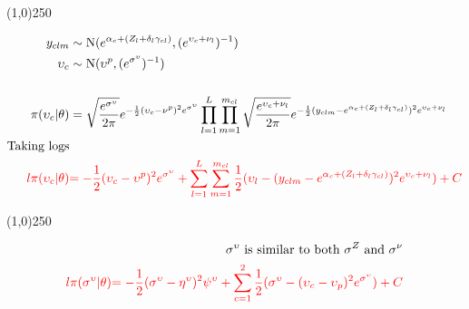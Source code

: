 \begin{center}
\line(1,0){250}
\end{center}

\begin{align*}
y_{clm} &\sim \operatorname{N}(e^{\alpha_{c}+(Z_{l}+\delta_{l}\gamma_{cl})},(e^{ \upsilon_{c}+\nu_{l} })^{-1})\\
\upsilon_{c} &\sim \operatorname{N}(\upsilon^p,({e^{\sigma^{\upsilon}}})^{-1})\\
\\
\pi(\upsilon_{c}|\theta)&=\sqrt{\frac{e^{{\sigma}^{\upsilon}}}{2\pi}} e^{-\frac{1}{2}(\upsilon_{c}-\nu^{p})^{2}e^{{\sigma}^{\upsilon}} }
\prod_{l=1}^{L}\prod_{m=1}^{m_{cl}}\sqrt{\frac{e^{ \upsilon_{c}+\nu_{l} }}{2\pi}} e^{-\frac{1}{2}(y_{clm}-e^{\alpha_{c}+(Z_{l}+\delta_{l}\gamma_{cl})})^{2}e^{ \upsilon_{c}+\nu_{l} } }\\
\text{Taking logs}\\
\color{red}{l\pi(\upsilon_{c}|\theta)}&
\color{red}{
=-\frac{1}{2}(\upsilon_{c}-\upsilon^{p})^{2}e^{\sigma^{\upsilon}}
+
\sum_{l=1}^{L}\sum_{m=1}^{m_{cl}}\frac{1}{2}(\upsilon_{l} -(y_{clm}-e^{\alpha_{c}+(Z_{l}+\delta_{l}\gamma_{cl})})^{2}e^{\upsilon_{c}+\nu_{l}})
+C
}
\end{align*}


\begin{center}
\line(1,0){250}
\end{center}


\begin{align*}
\text{$\sigma^{\upsilon}$ is similar to both $\sigma^{Z}$ and $\sigma^{\nu}$}\\
\color{red}{l\pi(\sigma^{\upsilon}|\theta)}
\color{red}{
=-\frac{1}{2}(\sigma^{\upsilon}-\eta^{\upsilon})^{2}\psi^{\upsilon}
+
\sum_{c=1}^{2}\frac{1}{2}(\sigma^{\upsilon} -(\upsilon_{c}-\upsilon_p)^{2}e^{\sigma^{\upsilon}})
+C}
\end{align*}
